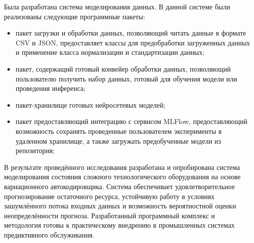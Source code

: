 \documentclass[14pt, a4paper, oneside]{extreport}
\begin{document}
Была разработана система моделирования данных. В данной системе были реализованы следующие программные пакеты:
\begin{itemize}
    \item пакет загрузки и обработки данных, позволяющий читать данные в формате CSV и JSON, предоставляет классы для предобработки загруженных данных и применение класса нормализации и стандартизации данных;
    \item пакет, содержащий готовый конвейер обработки данных, позволяющий пользователю получить набор данных, готовый для обучения модели или проведения инференса;
    \item пакет-хранилище готовых нейросетевых моделей;
    \item пакет предоставляющий интеграцию с сервисом MLFlow, предоставляющий возможность сохранять проведенные пользователем эксперименты в удаленном хранилище, а также загружать предобученные модели из репозитория;
\end{itemize} 

В результате проведённого исследования разработана и опробирована система моделирования состояния сложного технологического оборудования на основе вариационного автокодировщика. Система обеспечивает удовлетворительное прогнозирование остаточного ресурса, устойчивую работу в условиях зашумлённого потока входных данных и возможность вероятностной оценки неопределённости прогноза. Разработанный программный комплекс и методология готовы к практическому внедрению в промышленных системах предиктивного обслуживания.

\clearpage

\end{document}
